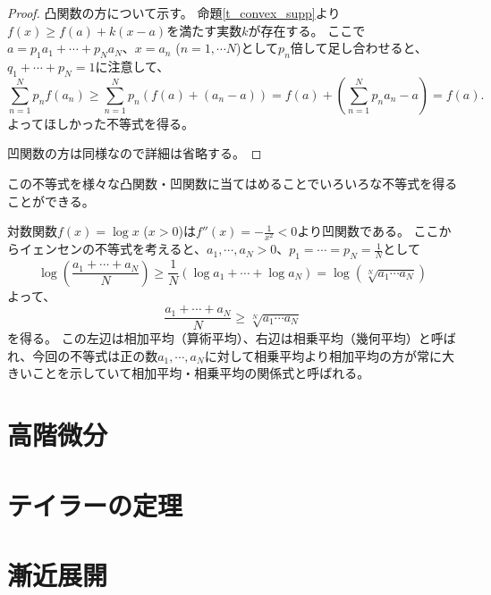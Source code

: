 \begin{proof}
凸関数の方について示す。
命題\ref{t_convex_supp}より$f(x) \ge f(a)+k(x-a)$を満たす実数$k$が存在する。
ここで$a = p_1 a_1+\cdots+p_N a_N$、$x = a_n$ ($n = 1, \cdots N$)として$p_n$倍して足し合わせると、$q_1+\cdots+p_N = 1$に注意して、
$$
\sum_{n = 1}^N p_n f(a_n) \ge \sum_{n = 1}^N p_n(f(a)+(a_n-a)) = f(a)+(\sum_{n = 1}^N p_n a_n-a) = f(a).
$$
よってほしかった不等式を得る。

凹関数の方は同様なので詳細は省略する。
\end{proof}

この不等式を様々な凸関数・凹関数に当てはめることでいろいろな不等式を得ることができる。

\begin{example}
対数関数$f(x) = \log x$ ($x > 0$)は$f''(x) = -\frac{1}{x^2} < 0$より凹関数である。
ここからイェンセンの不等式を考えると、$a_1, \cdots, a_N > 0$、$p_1 = \cdots = p_N = \frac{1}{N}$として
$$
\log(\frac{a_1+\cdots+a_N}{N}) \ge \frac{1}{N}(\log a_1+\cdots+\log a_N) = \log(\sqrt[N]{a_1\cdots a_N})
$$
よって、
$$
\frac{a_1+\cdots+a_N}{N} \ge \sqrt[N]{a_1\cdots a_N}
$$
を得る。
この左辺は相加平均（算術平均）、右辺は相乗平均（幾何平均）と呼ばれ、今回の不等式は正の数$a_1, \cdots, a_N$に対して相乗平均より相加平均の方が常に大きいことを示していて相加平均・相乗平均の関係式と呼ばれる。
\end{example}

\section{高階微分}

\section{テイラーの定理}

\section{漸近展開}
